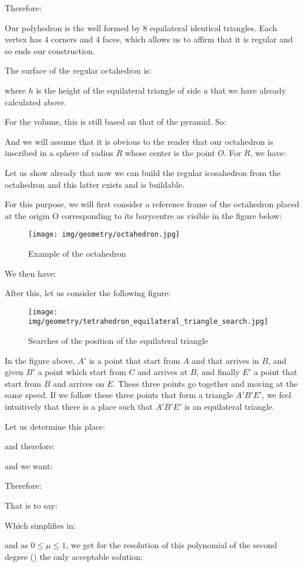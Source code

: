 {	Therefore:
	
	Our polyhedron is the well formed by $8$ equilateral identical triangles. Each vertex has $4$ corners and $4$ faces, which allows us to affirm that it is regular and so ends our construction.
	
	The surface of the regular octahedron is:
	
	where $h$ is the height of the equilateral triangle of side $a$ that we have already calculated above. 

	For the volume, this is still based on that of the pyramid. So:
	
	And we will assume that it is obvious to the reader that our octahedron is inscribed in a sphere of radius $R$ whose center is the point $O$. For $R$, we have:
	
	Let us show already that now we can build the regular icosahedron from the octahedron and this latter exists and is buildable.

	For this purpose, we will first consider a reference frame of the octahedron placed at the origin O corresponding to its barycentre as visible in the figure below:
	\begin{figure}[H]
		\centering
		\texttt{[image: img/geometry/octahedron.jpg]}
		\caption{Example of the octahedron}
	\end{figure}
	We then have:
	
	After this, let us consider the following figure:
	\begin{figure}[H]
		\centering
		\texttt{[image: img/geometry/tetrahedron\_equilateral\_triangle\_search.jpg]}
		\caption{Searches of the position of the equilateral triangle}
	\end{figure}
	In the figure above, $A'$ is a point that start from $A$ and that arrives in $B$, and given $B'$ a point which start from $C$ and arrives at $B$, and finally $E'$ a point that start from $B$ and arrives on $E$. These three points go together and moving at the same speed. If we follow these three points that form a triangle $A'B'E'$, we feel intuitively that there is a place such that $A'B'E'$ is an equilateral triangle.
	
	Let us determine this place:
	
	and therefore:
	
	and we want:
	
	Therefore:
	
	That is to say:
	
	Which simplifies in:
	
	and as $0\leq \mu \leq 1$, we get for the resolution of this polynomial of the second degree () the only acceptable solution:
	
}
